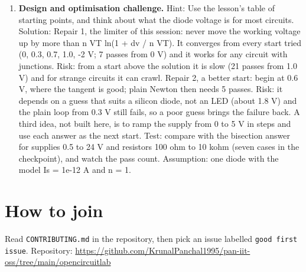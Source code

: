 \documentclass[11pt,a4paper]{article}
\begin{document}
\begin{enumerate}[nosep]
\item \textbf{Design and optimisation challenge.} Hint: Use the lesson's table of starting points, and think about what the diode voltage is for most circuits. Solution: Repair 1, the limiter of this session: never move the working voltage up by more than n VT ln(1 + dv / n VT). It converges from every start tried (0, 0.3, 0.7, 1.0, -2 V; 7 passes from 0 V) and it works for any circuit with junctions. Risk: from a start above the solution it is slow (21 passes from 1.0 V) and for strange circuits it can crawl. Repair 2, a better start: begin at 0.6 V, where the tangent is good; plain Newton then needs 5 passes. Risk: it depends on a guess that suits a silicon diode, not an LED (about 1.8 V) and the plain loop from 0.3 V still fails, so a poor guess brings the failure back. A third idea, not built here, is to ramp the supply from 0 to 5 V in steps and use each answer as the next start. Test: compare with the bisection answer for supplies 0.5 to 24 V and resistors 100 ohm to 10 kohm (seven cases in the checkpoint), and watch the pass count. Assumption: one diode with the model Is = 1e-12 A and n = 1.
\end{enumerate}

\section{How to join}
Read \texttt{CONTRIBUTING.md} in the repository, then pick an issue labelled \texttt{good first issue}. Repository: \url{https://github.com/KrunalPanchal1995/pan-iit-oss/tree/main/opencircuitlab}
\end{document}
